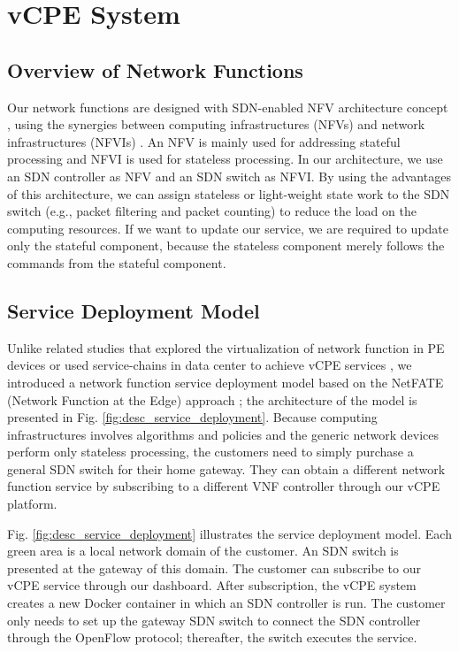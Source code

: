 \documentclass[conference]{IEEEtran}
\begin{document}
\section{vCPE System}
\subsection{Overview of Network Functions} \label{ssec:desc_nfv_overview}
Our network functions are designed with SDN-enabled NFV architecture concept \cite{sdn-enabled}, using the synergies between computing infrastructures (NFVs) and network infrastructures (NFVIs) \cite{etsi-nfv-terminology, etsi-nfv-infra}.
An NFV is mainly used for addressing stateful processing and NFVI is used for stateless processing. In our architecture, we use an SDN controller as NFV and an SDN switch as NFVI.
By using the advantages of this architecture, we can assign stateless or light-weight state work to the SDN switch (e.g., packet filtering and packet counting) to reduce the load on the computing resources. If we want to update our service, we are required to update only the stateful component, because the stateless component merely follows the commands from the stateful component.




\subsection{Service Deployment Model}
Unlike related studies that explored the virtualization of network function in PE devices \cite{vcpe-enhance} or used service-chains in data center to achieve vCPE services \cite{ericcson-vcpe}, we introduced a network function service deployment model based on the NetFATE (Network Function at the Edge) approach \cite{netfate}; the architecture of the model is presented in Fig. \ref{fig:desc_service_deployment}. Because computing infrastructures involves algorithms and policies and the generic network devices perform only stateless processing, the customers need to simply purchase a general SDN switch for their home gateway. They can obtain a different network function service by subscribing to a different VNF controller through our vCPE platform.

Fig. \ref{fig:desc_service_deployment} illustrates the service deployment model. Each green area is a local network domain of the customer. An SDN switch is presented at the gateway of this domain. The customer can subscribe to our vCPE service through our dashboard. After subscription, the vCPE system creates a new Docker container in which an SDN controller is run. The customer only needs to set up the gateway SDN switch to connect the SDN controller through the OpenFlow protocol; thereafter, the switch executes the service.
\end{document}
